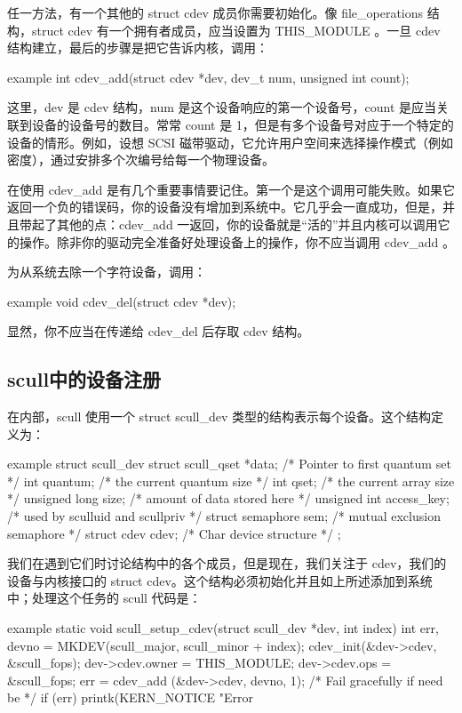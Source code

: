 \documentclass[lang=cn,newtx,10pt,scheme=chinese]{elegantbook}
\begin{document}
任一方法，有一个其他的 struct cdev 成员你需要初始化。像 file\_operations 结构，struct cdev 有一个拥有者成员，应当设置为 THIS\_MODULE 。一旦 cdev 结构建立，最后的步骤是把它告诉内核，调用：

\begin{mycode}{example}
    int cdev_add(struct cdev *dev, dev_t num, unsigned int count);
\end{mycode}

这里，dev 是 cdev 结构，num 是这个设备响应的第一个设备号，count 是应当关联到设备的设备号的数目。常常 count 是 1，但是有多个设备号对应于一个特定的设备的情形。例如，设想 SCSI 磁带驱动，它允许用户空间来选择操作模式（例如密度），通过安排多个次编号给每一个物理设备。

在使用 cdev\_add 是有几个重要事情要记住。第一个是这个调用可能失败。如果它返回一个负的错误码，你的设备没有增加到系统中。它几乎会一直成功，但是，并且带起了其他的点：cdev\_add 一返回，你的设备就是``活的''并且内核可以调用它的操作。除非你的驱动完全准备好处理设备上的操作，你不应当调用 cdev\_add 。

为从系统去除一个字符设备，调用：

\begin{mycode}{example}
    void cdev_del(struct cdev *dev);
\end{mycode}

显然，你不应当在传递给 cdev\_del 后存取 cdev 结构。

\subsection{scull中的设备注册}

在内部，scull 使用一个 struct scull\_dev 类型的结构表示每个设备。这个结构定义为：

\begin{mycode}{example}
struct scull_dev {
    struct scull_qset *data; /* Pointer to first quantum set */
    int quantum; /* the current quantum size */
    int qset; /* the current array size */
    unsigned long size; /* amount of data stored here */
    unsigned int access_key; /* used by sculluid and scullpriv */
    struct semaphore sem; /* mutual exclusion semaphore */
    struct cdev cdev; /* Char device structure */
};
\end{mycode}

我们在遇到它们时讨论结构中的各个成员，但是现在，我们关注于 cdev，我们的设备与内核接口的 struct cdev。这个结构必须初始化并且如上所述添加到系统中；处理这个任务的 scull 代码是：

\begin{mycode}{example}
static void scull_setup_cdev(struct scull_dev *dev, int index)
{
    int err, devno = MKDEV(scull_major, scull_minor + index);
    cdev_init(&dev->cdev, &scull_fops);
    dev->cdev.owner = THIS_MODULE;
    dev->cdev.ops = &scull_fops;
    err = cdev_add (&dev->cdev, devno, 1);
    /* Fail gracefully if need be */
    if (err)
        printk(KERN_NOTICE "Error %
}
\end{mycode}
\end{document}
